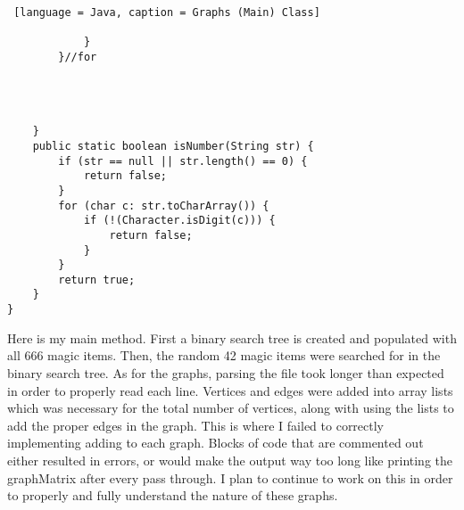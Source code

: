 \documentclass{article}
\begin{document}
\begin{lstlisting} [language = Java, caption = Graphs (Main) Class]
                
            }   
        }//for

              


    }
    public static boolean isNumber(String str) {
        if (str == null || str.length() == 0) {
            return false;
        }
        for (char c: str.toCharArray()) {
            if (!(Character.isDigit(c))) {
                return false;
            }
        }
        return true;
    }
}
\end{lstlisting}

\noindent Here is my main method. First a binary search tree is created and populated with all 666 magic items. Then, the random 42 magic items were searched for in the binary search tree. As for the graphs, parsing the file took longer than expected in order to properly read each line. Vertices and edges were added into array lists which was necessary for the total number of vertices, along with using the lists to add the proper edges in the graph. This is where I failed to correctly implementing adding to each graph. Blocks of code that are commented out either resulted in errors, or would make the output way too long like printing the graphMatrix after every pass through. I plan to continue to work on this in order to properly and fully understand the nature of these graphs. 
\end{document}
